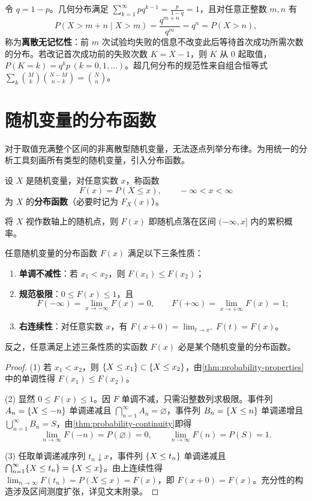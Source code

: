 令 $q=1-p$。几何分布满足 $\sum_{k=1}^{\infty}pq^{k-1}=\frac{p}{1-q}=1$，且对任意正整数 $m,n$ 有
\[
  P(X>m+n\mid X>m)=\frac{q^{m+n}}{q^m}=q^n=P(X>n),
\]
称为\textbf{离散无记忆性}：前 $m$ 次试验均失败的信息不改变此后等待首次成功所需次数的分布。若改记首次成功前的失败次数 $K=X-1$，则 $K$ 从 $0$ 起取值，$P(K=k)=q^kp\,(k=0,1,\ldots)$。超几何分布的规范性来自组合恒等式 $\sum_k\binom{M}{k}\binom{N-M}{n-k}=\binom{N}{n}$。

\section{随机变量的分布函数}
\label{sec:cdf}

对于取值充满整个区间的非离散型随机变量，无法逐点列举分布律。为用统一的分析工具刻画所有类型的随机变量，引入分布函数。

\begin{definition}[分布函数]
\label{def:cdf}
设 $X$ 是随机变量，对任意实数 $x$，称函数
\begin{equation}
  F(x)=P(X\le x),\qquad -\infty<x<\infty
  \label{eq:cdf-def}
\end{equation}
为 $X$ 的\textbf{分布函数}（必要时记为 $F_X(x)$）。
\end{definition}

将 $X$ 视作数轴上的随机点，则 $F(x)$ 即随机点落在区间 $(-\infty,x]$ 内的累积概率。

\begin{theorem}[分布函数的基本性质]
\label{thm:cdf-properties}
任意随机变量的分布函数 $F(x)$ 满足以下三条性质：
\begin{enumerate}
  \item \textbf{单调不减性}：若 $x_1<x_2$，则 $F(x_1)\le F(x_2)$；
  \item \textbf{规范极限}：$0\le F(x)\le 1$，且
  \[
    F(-\infty)=\lim_{x\to-\infty}F(x)=0,\qquad F(+\infty)=\lim_{x\to+\infty}F(x)=1;
  \]
  \item \textbf{右连续性}：对任意实数 $x$，有 $F(x+0)=\lim_{t\to x^+}F(t)=F(x)$。
\end{enumerate}
反之，任意满足上述三条性质的实函数 $F(x)$ 必是某个随机变量的分布函数。
\end{theorem}
\begin{proof}
(1) 若 $x_1<x_2$，则 $\{X\le x_1\}\subset\{X\le x_2\}$，由\cref{thm:probability-properties}中的单调性得 $F(x_1)\le F(x_2)$。

(2) 显然 $0\le F(x)\le 1$。因 $F$ 单调不减，只需沿整数列求极限。事件列 $A_n=\{X\le -n\}$ 单调递减且 $\bigcap_{n=1}^{\infty}A_n=\varnothing$，事件列 $B_n=\{X\le n\}$ 单调递增且 $\bigcup_{n=1}^{\infty}B_n=S$，由\cref{thm:probability-continuity}即得
\[
  \lim_{n\to\infty}F(-n)=P(\varnothing)=0,\qquad \lim_{n\to\infty}F(n)=P(S)=1.
\]

(3) 任取单调递减序列 $t_n\downarrow x$，事件列 $\{X\le t_n\}$ 单调递减且 $\bigcap_{n=1}^{\infty}\{X\le t_n\}=\{X\le x\}$。由上连续性得 $\lim_{n\to\infty}F(t_n)=P(X\le x)=F(x)$，即 $F(x+0)=F(x)$。充分性的构造涉及区间测度扩张，详见文末附录。
\end{proof}

